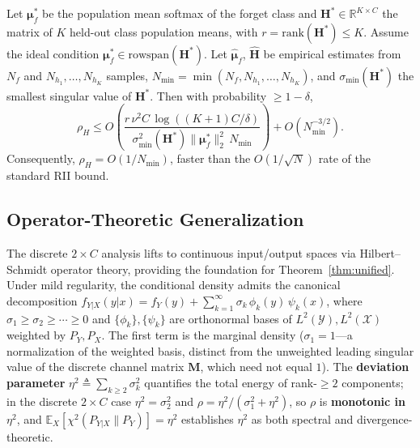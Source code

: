 \documentclass[smallextended]{svjour3}       %
\newcommand{\coloneqq}{\triangleq}
\begin{document}
\begin{theorem}
\label{thm:softmax_deviation}
Let $\boldsymbol{\mu}_f^*$ be the population mean softmax of the forget class and $\mathbf{H}^* \in \mathbb{R}^{K\times C}$ the matrix of $K$ held-out class population means, with $r=\mathrm{rank}(\mathbf{H}^*)\le K$. Assume the ideal condition $\boldsymbol{\mu}_f^* \in \mathrm{rowspan}(\mathbf{H}^*)$. Let $\hat{\boldsymbol{\mu}}_f$, $\hat{\mathbf{H}}$ be empirical estimates from $N_f$ and $N_{h_1},\dots,N_{h_K}$ samples, $N_{\min} = \min(N_f,N_{h_1},\dots,N_{h_K})$, and $\sigma_{\min}(\mathbf{H}^*)$ the smallest singular value of $\mathbf{H}^*$. Then with probability $\ge 1-\delta$,
\begin{equation}
\rho_H \le O\!\left(\frac{r\,\nu^2 C\,\log((K+1)C/\delta)}{\sigma_{\min}^2(\mathbf{H}^*)\|\boldsymbol{\mu}_f^*\|_2^2\,N_{\min}}\right) + O(N_{\min}^{-3/2}).
\end{equation}
Consequently, $\rho_H = O(1/N_{\min})$, faster than the $O(1/\sqrt{N})$ rate of the standard RII bound.
\end{theorem}

\subsection{Operator-Theoretic Generalization}

The discrete $2\times C$ analysis lifts to continuous input/output spaces via Hilbert--Schmidt operator theory, providing the foundation for Theorem~\ref{thm:unified}. Under mild regularity, the conditional density admits the canonical decomposition $f_{Y|X}(y|x)=f_Y(y)+\sum_{k=1}^{\infty}\sigma_k\,\phi_k(y)\,\psi_k(x)$, where $\sigma_1\ge\sigma_2\ge\cdots\ge0$ and $\{\phi_k\},\{\psi_k\}$ are orthonormal bases of $L^2(\mathcal{Y}),L^2(\mathcal{X})$ weighted by $P_Y,P_X$. The first term is the marginal density ($\sigma_1=1$---a normalization of the weighted basis, distinct from the unweighted leading singular value of the discrete channel matrix $\mathbf{M}$, which need not equal $1$). The \textbf{deviation parameter} $\eta^2\coloneqq\sum_{k\ge2}\sigma_k^2$ quantifies the total energy of rank-$\ge2$ components; in the discrete $2\times C$ case $\eta^2=\sigma_2^2$ and $\rho=\eta^2/(\sigma_1^2+\eta^2)$, so $\rho$ is \textbf{monotonic in $\eta^2$}, and $\mathbb{E}_X[\chi^2(P_{Y|X}\|P_Y)]=\eta^2$ establishes $\eta^2$ as both spectral and divergence-theoretic.

\end{document}
